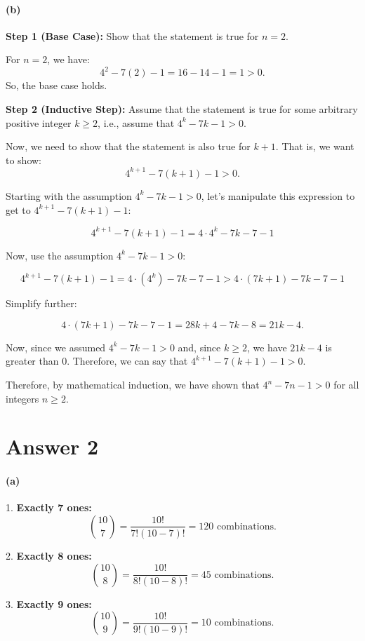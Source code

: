 \documentclass[12pt]{article}
\begin{document}
\paragraph{(b)}

\textbf{Step 1 (Base Case):}
Show that the statement is true for \(n = 2\).

For \(n = 2\), we have:
\[4^2 - 7(2) - 1 = 16 - 14 - 1 = 1 > 0.\]
So, the base case holds.

\textbf{Step 2 (Inductive Step):}
Assume that the statement is true for some arbitrary positive integer \(k \geq 2\), i.e., assume that \(4^k - 7k - 1 > 0\).

Now, we need to show that the statement is also true for \(k + 1\). That is, we want to show:
\[4^{k+1} - 7(k+1) - 1 > 0.\]

Starting with the assumption \(4^k - 7k - 1 > 0\), let's manipulate this expression to get to \(4^{k+1} - 7(k+1) - 1\):

\[4^{k+1} - 7(k+1) - 1 = 4 \cdot 4^k - 7k - 7 - 1\]

Now, use the assumption \(4^k - 7k - 1 > 0\):

\[4^{k+1} - 7(k+1) - 1 = 4 \cdot (4^k) - 7k - 7 - 1 > 4 \cdot (7k + 1) - 7k - 7 - 1\]

Simplify further:

\[4 \cdot (7k + 1) - 7k - 7 - 1 = 28k + 4 - 7k - 8 = 21k - 4.\]

Now, since we assumed \(4^k - 7k - 1 > 0\) and, since \(k \geq 2\), we have \(21k - 4\) is greater than 0.
Therefore, we can say that \(4^{k+1} - 7(k+1) - 1 > 0 \).

Therefore, by mathematical induction, we have shown that \(4^n - 7n - 1 > 0\) for all integers \(n \geq 2\).

\section*{Answer 2}
\paragraph{(a)}

1. \textbf{Exactly 7 ones:}
   \[
   \binom{10}{7} = \frac{10!}{7!(10-7)!} = 120 \text{ combinations.}
   \]

2. \textbf{Exactly 8 ones:}
   \[
   \binom{10}{8} = \frac{10!}{8!(10-8)!} = 45 \text{ combinations.}
   \]

3. \textbf{Exactly 9 ones:}
   \[
   \binom{10}{9} = \frac{10!}{9!(10-9)!} = 10 \text{ combinations.}
   \]
\end{document}
